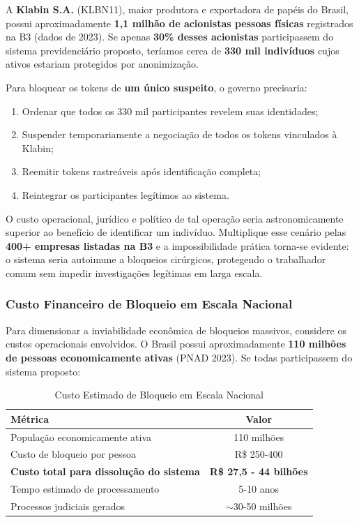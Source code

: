A \textbf{Klabin S.A.} (KLBN11), maior produtora e exportadora de papéis do Brasil, possui aproximadamente \textbf{1,1 milhão de acionistas pessoas físicas} registrados na B3 (dados de 2023). Se apenas \textbf{30\% desses acionistas} participassem do sistema previdenciário proposto, teríamos cerca de \textbf{330 mil indivíduos} cujos ativos estariam protegidos por anonimização.

Para bloquear os tokens de \textbf{um único suspeito}, o governo precisaria:

\begin{enumerate}
    \item Ordenar que todos os 330 mil participantes revelem suas identidades;
    \item Suspender temporariamente a negociação de todos os tokens vinculados à Klabin;
    \item Reemitir tokens rastreáveis após identificação completa;
    \item Reintegrar os participantes legítimos ao sistema.
\end{enumerate}

O custo operacional, jurídico e político de tal operação seria astronomicamente superior ao benefício de identificar um indivíduo. Multiplique esse cenário pelas \textbf{400+ empresas listadas na B3} e a impossibilidade prática torna-se evidente: o sistema seria autoimune a bloqueios cirúrgicos, protegendo o trabalhador comum sem impedir investigações legítimas em larga escala.

\subsubsection{Custo Financeiro de Bloqueio em Escala Nacional}

Para dimensionar a inviabilidade econômica de bloqueios massivos, considere os custos operacionais envolvidos. O Brasil possui aproximadamente \textbf{110 milhões de pessoas economicamente ativas} (PNAD 2023). Se todas participassem do sistema proposto:

\begin{table}[htb]
    \centering
    \caption{Custo Estimado de Bloqueio em Escala Nacional}
    \label{tab:custo-bloqueio}
    \begin{tabular}{p{6cm}c}
        \toprule
        \textbf{Métrica} & \textbf{Valor} \\
        \midrule
        População economicamente ativa & 110 milhões \\
        Custo de bloqueio por pessoa & R\$ 250-400 \\
        \textbf{Custo total para dissolução do sistema} & \textbf{R\$ 27,5 - 44 bilhões} \\
        Tempo estimado de processamento & 5-10 anos \\
        Processos judiciais gerados & $\sim$30-50 milhões \\
        \bottomrule
    \end{tabular}
\end{table}

